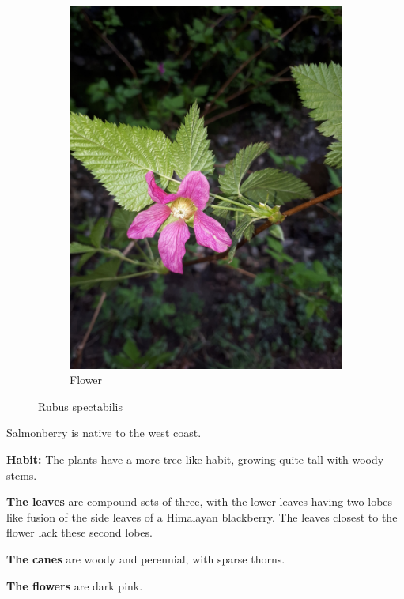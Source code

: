 \begin{figure}
\begin{subfigure}{0.48\textwidth}
    \includegraphics[width=\textwidth]{rubus/spectabilis_flower_01}
    \caption{Flower}
    \label{fig:rub:spectabilis:berry}
\end{subfigure}

        
\caption{Rubus spectabilis}
\label{fig:rub:spectabilis}
\end{figure}

Salmonberry is native to the west coast.

\textbf{Habit:} The plants have a more tree like habit, growing quite tall with woody stems.

\textbf{The leaves} are compound sets of three, with the lower leaves having two lobes like fusion of the side leaves of a Himalayan blackberry. The leaves closest to the flower lack these second lobes.

\textbf{The canes} are woody and perennial, with sparse thorns.

\textbf{The flowers} are dark pink.

